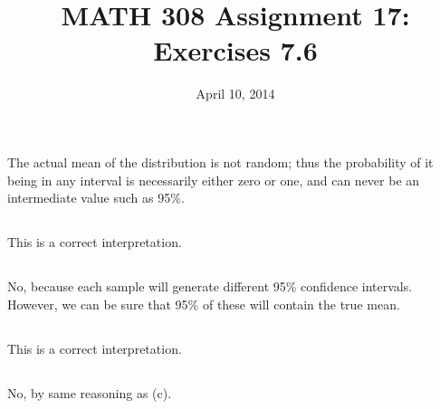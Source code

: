 \documentclass[twocolumn]{article}
\title{MATH 308 Assignment 17:\\Exercises 7.6}
\date{April 10, 2014}
\begin{document}
\maketitle

\subsection{}
The actual mean of the distribution is not random; thus the probability of it being in any interval is necessarily either zero or one, and can never be an intermediate value such as 95\%.
\subsection{}
This is a correct interpretation.
\subsection{}
No, because each sample will generate different 95\% confidence intervals. However, we can be sure that 95\% of these will contain the true mean.
\subsection{}
This is a correct interpretation.
\subsection{}
No, by same reasoning as (c).



\end{document}
